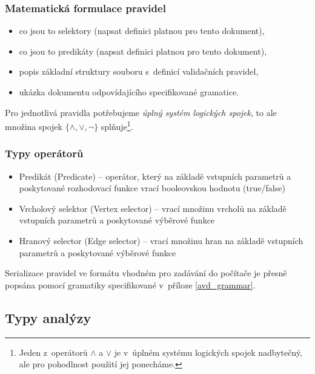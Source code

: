 \subsubsection{Matematická formulace pravidel}
\begin{itemize}
\item co jsou to selektory (napsat definici platnou pro tento dokument),
\item co jsou to predikáty (napsat definici platnou pro tento dokument),
\item popis základní struktury souboru s~definicí validačních pravidel,
\item ukázka dokumentu odpovídajícího specifikované gramatice.
\end{itemize}

Pro jednotlivá pravidla potřebujeme \emph{úplný systém logických spojek}, to ale množina spojek $\{\wedge, \vee, \neg\}$ splňuje\footnote{Jeden z~operátorů $\wedge$ a $\vee$ je v~úplném systému logických spojek nadbytečný, ale pro pohodlnost použití jej ponecháme.}.

\subsubsection{Typy operátorů}
\begin{itemize}
\item Predikát (Predicate) -- operátor, který na základě vstupních parametrů a poskytované rozhodovací funkce vrací booleovskou hodnotu (true/false)
\item Vrcholový selektor (Vertex selector) -- vrací množinu vrcholů na základě vstupních parametrů a poskytované výběrové funkce
\item Hranový selector (Edge selector) -- vrací množinu hran na základě vstupních parametrů a poskytované výběrové funkce
\end{itemize}


Serializace pravidel ve formátu vhodném pro zadávání do počítače je přesně popsána pomocí gramatiky specifikované v~příloze \ref{avd_grammar}.


\subsection{Typy analýzy}

